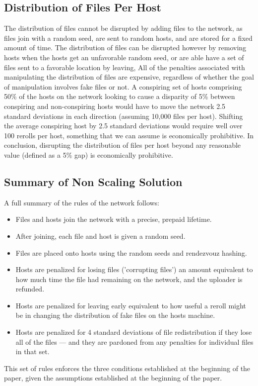\documentclass[twocolumn]{article}
\begin{document}
\subsection{Distribution of Files Per Host}
The distribution of files cannot be disrupted by adding files to the network, as files join with a random seed, are sent to random hosts, and are stored for a fixed amount of time.
The distribution of files can be disrupted however by removing hosts when the hosts get an unfavorable random seed, or are able have a set of files sent to a favorable location by leaving,
All of the penalties associated with manipulating the distribution of files are expensive, regardless of whether the goal of manipulation involves fake files or not.
A conspiring set of hosts comprising 50\% of the hosts on the network looking to cause a disparity of 5\% between conspiring and non-conspiring hosts would have to move the network 2.5 standard deviations in each direction (assuming 10,000 files per host).
Shifting the average conspiring host by 2.5 standard deviations would require well over 100 rerolls per host, something that we can assume is economically prohibitive.
In conclusion, disrupting the distribution of files per host beyond any reasonable value (defined as a 5\% gap) is economically prohibitive.

\subsection{Summary of Non Scaling Solution}
A full summary of the rules of the network follows:
\begin{itemize}
	\item Files and hosts join the network with a precise, prepaid lifetime.
	\item After joining, each file and host is given a random seed.
	\item Files are placed onto hosts using the random seeds and rendezvouz hashing.
	\item Hosts are penalized for losing files ('corrupting files') an amount equivalent to how much time the file had remaining on the network, and the uploader is refunded.
	\item Hosts are penalized for leaving early equivalent to how useful a reroll might be in changing the distribution of fake files on the hosts machine.
	\item Hosts are penalized for 4 standard deviations of file redistribution if they lose all of the files --- and they are pardoned from any penalties for individual files in that set.
\end{itemize}
This set of rules enforces the three conditions established at the beginning of the paper, given the assumptions established at the beginning of the paper.
\end{document}
